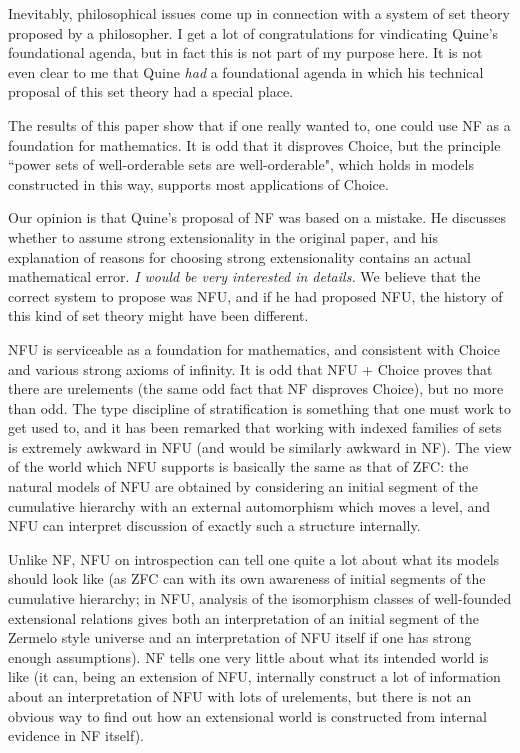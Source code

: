 \documentclass[112pt]{article}
\theoremstyle{definition}
\theoremstyle{remark}
\newcommand{\rk}[1]{{\color{blue}\sl #1}}
\begin{document}
Inevitably, philosophical issues come up in connection with a system of set theory proposed by a philosopher.  I get a lot of congratulations for vindicating Quine's foundational agenda, but in fact this is not part of my purpose here.  It is not even clear to me that Quine {\em had\/} a foundational agenda in which his technical proposal of this set theory had a special place.

The results of this paper show that if one really wanted to, one could use NF as a foundation for mathematics.  It is odd that it disproves Choice, but the principle ``power sets of well-orderable sets are well-orderable", which holds in models constructed in this way, supports most applications of Choice.

Our opinion is that Quine's proposal of NF was based on a mistake.  He discusses whether to assume strong extensionality in the original paper, and his explanation of reasons for choosing strong extensionality contains an actual mathematical error.  \rk{I would be very interested in details.}  We believe that the correct system to propose was NFU, and if he had proposed NFU, the history of this kind of set theory might have been different.

NFU is serviceable as a foundation for mathematics, and consistent with Choice and various strong axioms of infinity.  It is odd that NFU + Choice proves that there are urelements (the same odd fact that NF disproves Choice), but no more than odd.
The type discipline of stratification is something that one must work to get used to, and it has been remarked that working with indexed families of sets is extremely awkward in NFU (and would be similarly awkward in NF).  The view of the world which NFU supports is basically the same as that of ZFC:  the natural models of NFU are obtained by considering an initial segment of the cumulative hierarchy with an external automorphism which moves a level, and NFU can interpret discussion of exactly such a structure internally.

Unlike NF, NFU on introspection can tell one quite a lot about what its models should look like (as ZFC can with its own awareness of initial segments of the cumulative hierarchy; in NFU, analysis of the isomorphism classes of well-founded extensional relations gives both an interpretation of an initial segment of the Zermelo style universe and an interpretation of NFU itself if one has strong enough assumptions).    NF tells one very little about what its intended world is like (it can, being an extension of NFU, internally construct a lot of information about an interpretation of NFU with lots of urelements, but there is not an obvious way to find out how an extensional world is constructed from internal evidence in NF itself).
\end{document}
